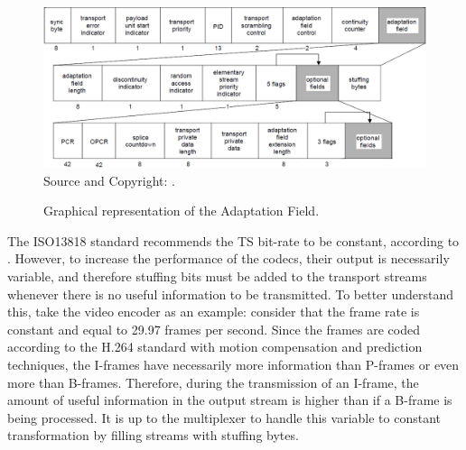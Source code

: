 \documentclass[
	12pt,				%
	openright,			%
	twoside,			%
	a4paper,			%
	brazil,
	french,				%
	english
	]{abntex2}
\begin{document}
\begin{figure}
\centering
\caption{Graphical representation of the Adaptation Field.}
\includegraphics[width=1\linewidth]{figuras/AdapField_iso13818.png}
\\Source and Copyright: .
\label{fig:AdapField_iso13818}
\end{figure}



The ISO13818 standard recommends the TS bit-rate to be constant, according to . However, to increase the performance of the codecs, their output is necessarily variable, and therefore stuffing bits must be added to the transport streams whenever there is no useful information to be transmitted. To better understand this, take the video encoder as an example: consider that the frame rate is constant and equal to 29.97 frames per second. Since the frames are coded according to the H.264 standard with motion compensation and prediction techniques, the I-frames have necessarily more information than P-frames or even more than B-frames. Therefore, during the transmission of an I-frame, the amount of useful information in the output stream is higher than if a B-frame is being processed. It is up to the multiplexer to handle this variable to constant transformation by filling streams with stuffing bytes.
\end{document}
